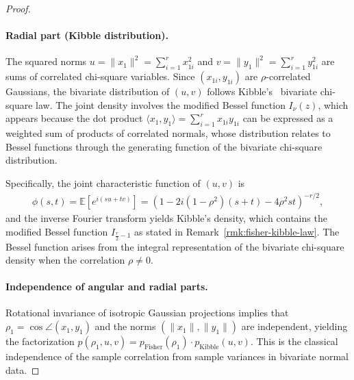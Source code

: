 \begin{proof}
\paragraph{Radial part (Kibble distribution).}
The squared norms \(u = \|x_1\|^2 = \sum_{i=1}^r x_{1i}^2\) and \(v = \|y_1\|^2 = \sum_{i=1}^r y_{1i}^2\) are sums of correlated chi-square variables. Since \((x_{1i}, y_{1i})\) are \(\rho\)-correlated Gaussians, the bivariate distribution of \((u, v)\) follows Kibble's~\cite{kibble1941two} bivariate chi-square law. The joint density involves the modified Bessel function \(I_{\nu}(z)\), which appears because the dot product \(\langle x_1, y_1 \rangle = \sum_{i=1}^r x_{1i} y_{1i}\) can be expressed as a weighted sum of products of correlated normals, whose distribution relates to Bessel functions through the generating function of the bivariate chi-square distribution.

Specifically, the joint characteristic function of \((u, v)\) is
\begin{align}
\phi(s, t) = \mathbb{E}[e^{i(su + tv)}] = \left(1 - 2i(1-\rho^2)(s+t) - 4\rho^2 st\right)^{-r/2},
\end{align}
and the inverse Fourier transform yields Kibble's density, which contains the modified Bessel function \(I_{\frac{r}{2}-1}\) as stated in Remark~\ref{rmk:fisher-kibble-law}. The Bessel function arises from the integral representation of the bivariate chi-square density when the correlation \(\rho \neq 0\).

\paragraph{Independence of angular and radial parts.}
Rotational invariance of isotropic Gaussian projections implies that \(\rho_1 = \cos\angle(x_1, y_1)\) and the norms \((\|x_1\|, \|y_1\|)\) are independent, yielding the factorization \(p(\rho_1, u, v) = p_{\text{Fisher}}(\rho_1) \cdot p_{\text{Kibble}}(u, v)\). This is the classical independence of the sample correlation from sample variances in bivariate normal data.
\end{proof}

